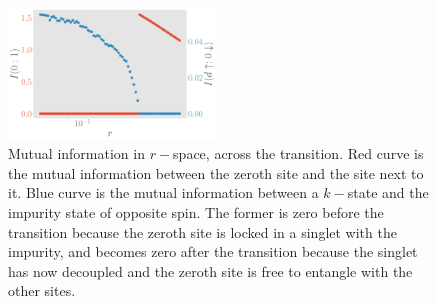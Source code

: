\documentclass[reprint,superscriptaddress,floatfix]{revtex4-2}
\begin{document}
\begin{figure}[!htb]
\includegraphics[width=0.49\textwidth]{../figures/I_r.pdf}
\caption{Mutual information in \(r-\)space, across the transition. Red curve is the mutual information between the zeroth site and the site next to it. Blue curve is the mutual information between a \(k-\)state and the impurity state of opposite spin. The former is zero before the transition because the zeroth site is locked in a singlet with the impurity, and becomes zero after  the transition because the singlet has now decoupled and the zeroth site is free to entangle with the other sites.}
\label{mut_inf_r}
\end{figure}
\end{document}
